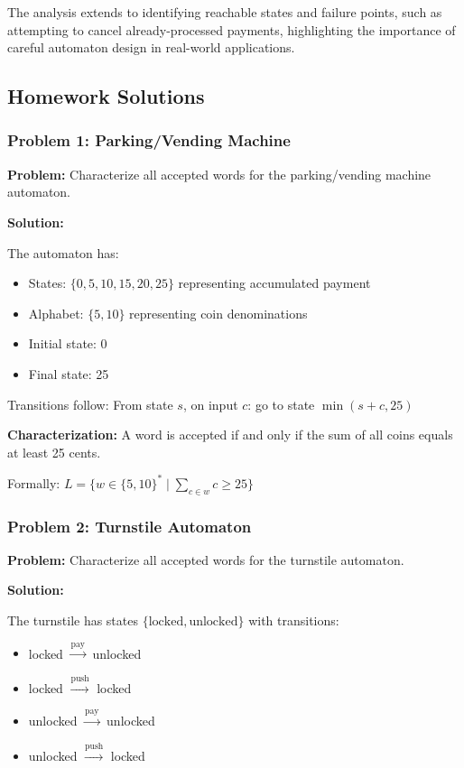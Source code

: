 \documentclass{article}
\begin{document}
The analysis extends to identifying reachable states and failure points, such as attempting to cancel already-processed payments, highlighting the importance of careful automaton design in real-world applications.

\subsection{Homework Solutions}

\subsubsection{Problem 1: Parking/Vending Machine}

\textbf{Problem:} Characterize all accepted words for the parking/vending machine automaton.

\textbf{Solution:}

The automaton has:
\begin{itemize}
    \item States: $\{0, 5, 10, 15, 20, 25\}$ representing accumulated payment
    \item Alphabet: $\{5, 10\}$ representing coin denominations
    \item Initial state: 0
    \item Final state: 25
\end{itemize}

Transitions follow: From state $s$, on input $c$: go to state $\min(s+c, 25)$

\textbf{Characterization:} A word is accepted if and only if the sum of all coins equals at least 25 cents.

Formally: $L = \{w \in \{5,10\}^* \mid \sum_{c \in w} c \geq 25\}$

\subsubsection{Problem 2: Turnstile Automaton}

\textbf{Problem:} Characterize all accepted words for the turnstile automaton.

\textbf{Solution:}

The turnstile has states $\{\text{locked}, \text{unlocked}\}$ with transitions:
\begin{itemize}
    \item locked $\xrightarrow{\text{pay}}$ unlocked
    \item locked $\xrightarrow{\text{push}}$ locked
    \item unlocked $\xrightarrow{\text{pay}}$ unlocked
    \item unlocked $\xrightarrow{\text{push}}$ locked
\end{itemize}
\end{document}
